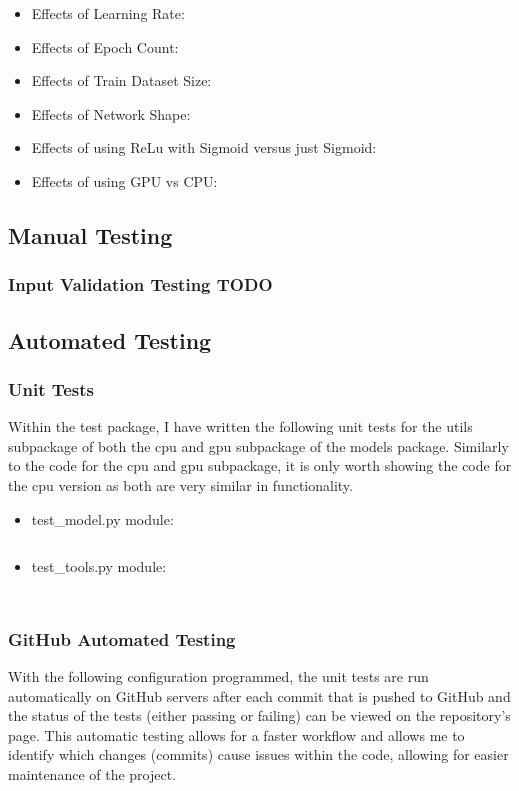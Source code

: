 \documentclass[./project-report/src/latex/project-report.tex]{subfiles}
\begin{document}
\begin{itemize}
    \item Effects of Learning Rate:
    \item Effects of Epoch Count:
    \item Effects of Train Dataset Size:
    \item Effects of Network Shape:
    \item Effects of using ReLu with Sigmoid versus just Sigmoid:
    \item Effects of using GPU vs CPU:
\end{itemize}

\subsection{Manual Testing}

\subsubsection{Input Validation Testing TODO}

\subsection{Automated Testing}

\subsubsection{Unit Tests}

Within the test package, I have written the following unit tests for the utils subpackage of both the cpu and gpu subpackage of the models package. Similarly to the code for the cpu 
and gpu subpackage, it is only worth showing the code for the cpu version as both are very similar in functionality.

\begin{itemize}
    \item test\_model.py module:
        \inputminted{python}{./school_project/test/models/cpu/utils/test_model.py}

        \pagebreak

    \item test\_tools.py module:
        \inputminted{python}{./school_project/test/models/cpu/utils/test_tools.py}
\end{itemize}

\inputminted{python}{./school_project/test/models/cpu.py}

\subsubsection{GitHub Automated Testing}

With the following configuration programmed, the unit tests are run automatically on GitHub servers after each commit that is pushed to GitHub and the status of the tests 
(either passing or failing) can be viewed on the repository's page. This automatic testing allows for a faster workflow and allows me to identify which changes (commits) 
cause issues within the code, allowing for easier maintenance of the project.

\inputminted{yaml}{./.github/workflows/tests.yml}
\end{document}
